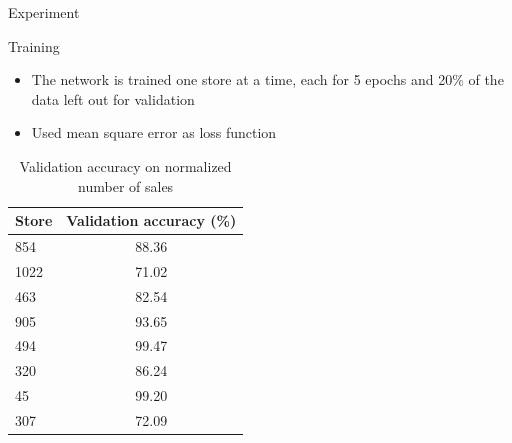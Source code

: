 \documentclass[10pt]{beamer}
\begin{document}
\begin{frame}{Experiment}
    \begin{alertblock}{Training}
    \begin{itemize}
        \item The network is trained one store at a time, each for 5 epochs and 20\% of the data left out for validation
        \item Used mean square error as loss function
    \end{itemize}
    \end{alertblock}

    \begin{table}
        \begin{tabular}{lc}
            \toprule
            Store  & Validation accuracy (\%)\\
            \toprule
            854    & 88.36 \\
            1022   & 71.02 \\
            463    & 82.54 \\
            905    & 93.65 \\
            494    & 99.47 \\
            320    & 86.24 \\
            45     & 99.20\\
            307    & 72.09\\
            \bottomrule
        \end{tabular}
        \caption{Validation accuracy on normalized number of sales}
    \end{table}
\end{frame}
\end{document}

